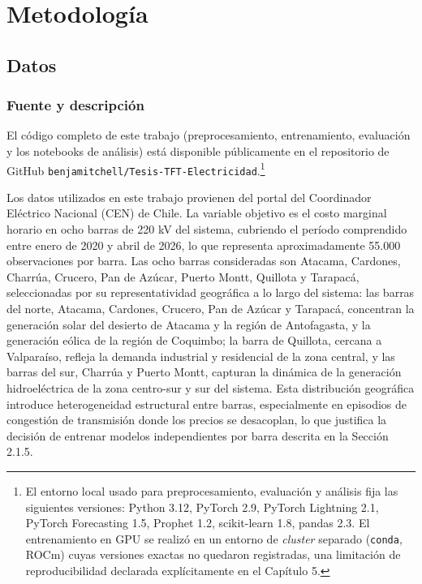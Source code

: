 \chapter{Metodología}

\section{Datos}

\subsection{Fuente y descripción}

El código completo de este trabajo (preprocesamiento, entrenamiento, evaluación y los notebooks de análisis) está disponible públicamente en el repositorio de GitHub \texttt{benjamitchell/}\allowbreak\texttt{Tesis-TFT-Electricidad}.\footnote{El entorno local usado para preprocesamiento, evaluación y análisis fija las siguientes versiones: Python 3.12, PyTorch 2.9, PyTorch Lightning 2.1, PyTorch Forecasting 1.5, Prophet 1.2, scikit-learn 1.8, pandas 2.3. El entrenamiento en GPU se realizó en un entorno de \textit{cluster} separado (\texttt{conda}, ROCm) cuyas versiones exactas no quedaron registradas, una limitación de reproducibilidad declarada explícitamente en el Capítulo 5.}

Los datos utilizados en este trabajo provienen del portal del Coordinador Eléctrico Nacional (CEN) de Chile. La variable objetivo es el costo marginal horario en ocho barras de 220 kV del sistema, cubriendo el período comprendido entre enero de 2020 y abril de 2026, lo que representa aproximadamente 55.000 observaciones por barra. Las ocho barras consideradas son Atacama, Cardones, Charrúa, Crucero, Pan de Azúcar, Puerto Montt, Quillota y Tarapacá, seleccionadas por su representatividad geográfica a lo largo del sistema: las barras del norte, Atacama, Cardones, Crucero, Pan de Azúcar y Tarapacá, concentran la generación solar del desierto de Atacama y la región de Antofagasta, y la generación eólica de la región de Coquimbo; la barra de Quillota, cercana a Valparaíso, refleja la demanda industrial y residencial de la zona central, y las barras del sur, Charrúa y Puerto Montt, capturan la dinámica de la generación hidroeléctrica de la zona centro-sur y sur del sistema. Esta distribución geográfica introduce heterogeneidad estructural entre barras, especialmente en episodios de congestión de transmisión donde los precios se desacoplan, lo que justifica la decisión de entrenar modelos independientes por barra descrita en la Sección 2.1.5.

